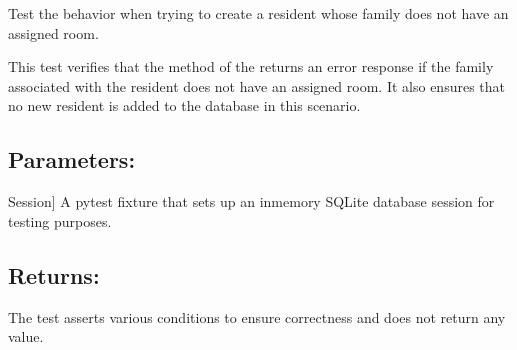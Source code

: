 \documentclass[letterpaper,10pt,english]{sphinxmanual}
\begin{document}
\begin{fulllineitems}
\label{\detokenize{test:test.test_residetnt.test_create_resident_family_no_room}}
\pysigstartsignatures
\pysiglinewithargsret
{}
{}
{}
\pysigstopsignatures
\sphinxAtStartPar
Test the behavior when trying to create a resident whose family does not have an assigned room.

\sphinxAtStartPar
This test verifies that the  method of the 
returns an error response if the family associated with the resident does not
have an assigned room. It also ensures that no new resident is added to the database
in this scenario.


\subsection{Parameters:}
\label{\detokenize{test:id1}}\begin{description}
\sphinxlineitem{setup\_database}{[}Session{]}
\sphinxAtStartPar
A pytest fixture that sets up an in\sphinxhyphen{}memory SQLite database session
for testing purposes.

\end{description}


\subsection{Returns:}
\label{\detokenize{test:id2}}\begin{description}
\sphinxAtStartPar
The test asserts various conditions to ensure correctness and does not
return any value.

\end{description}

\end{fulllineitems}

\end{document}
